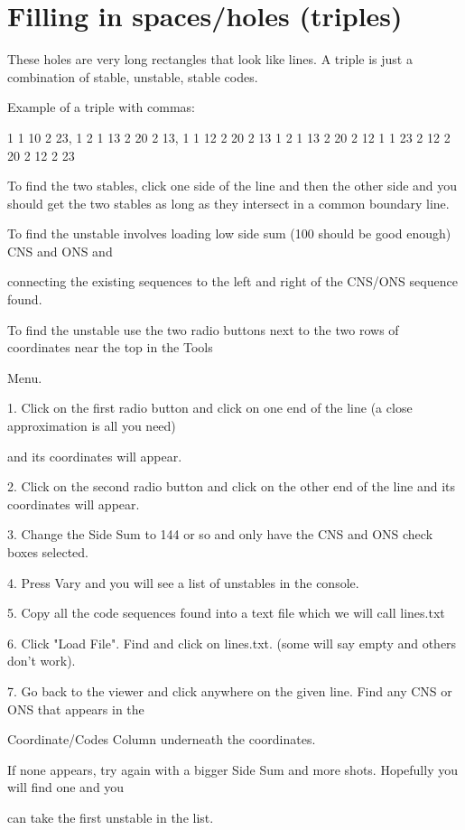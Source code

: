 \documentclass[11pt]{report}
\begin{document}
\section{Filling in spaces/holes (triples)}

These holes are very long rectangles that look like lines. A triple is just a combination of stable, unstable, stable codes.

Example of a triple with commas:

1 1 10 2 23, 1 2 1 13 2 20 2 13, 1 1 12 2 20 2 13 1 2 1 13 2 20 2 12 1 1 23 2 12 2 20 2 12 2 23

To find the two stables, click one side of the line and then the other side and you should get the two stables as long as they intersect in a common boundary line.

To find the unstable involves loading low side sum (100 should be good enough) CNS and ONS and

connecting the existing sequences to the left and right of the CNS/ONS sequence found.

To find the unstable use the two radio buttons next to the two rows of coordinates near the top in the Tools

Menu.

1. Click on the first radio button and click on one end of the line (a close approximation is all you need)

and its coordinates will appear.

2. Click on the second radio button and click on the other end of the line and its coordinates will appear.

3. Change the Side Sum to 144 or so and only have the CNS and ONS check boxes selected.

4. Press Vary and you will see a list of unstables in the console.

5. Copy all the code sequences found into a text file which we will call lines.txt

6. Click "Load File". Find and click on lines.txt. (some will say empty and others don't work).

7. Go back to the viewer and click anywhere on the given line. Find any CNS or ONS that appears in the

Coordinate/Codes Column underneath the coordinates.

If none appears, try again with a bigger Side Sum and more shots. Hopefully you will find one and you

can take the first unstable in the list.
\end{document}
